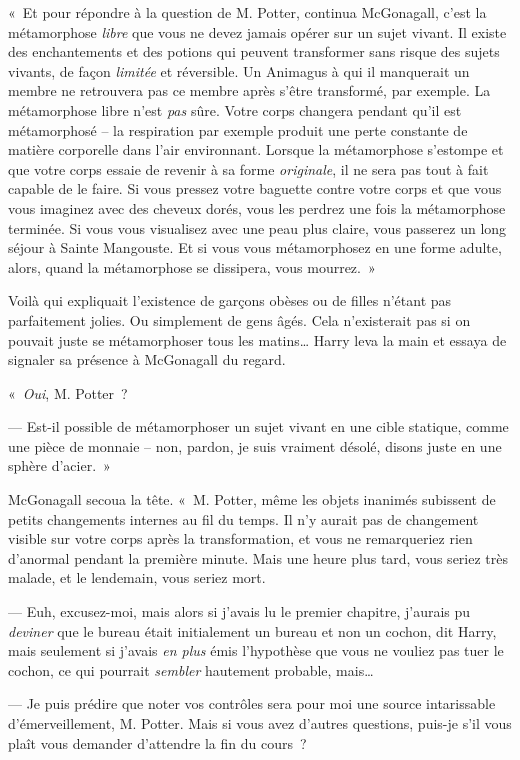 «~Et pour répondre à la question de M. Potter, continua McGonagall, c'est la métamorphose \emph{libre} que vous ne devez jamais opérer sur un sujet vivant.
Il existe des enchantements et des potions qui peuvent transformer sans risque des sujets vivants, de façon \emph{limitée} et réversible.
Un Animagus à qui il manquerait un membre ne retrouvera pas ce membre après s'être transformé, par exemple.
La métamorphose libre n'est \emph{pas} sûre.
Votre corps changera pendant qu'il est métamorphosé -- la respiration par exemple produit une perte constante de matière corporelle dans l'air environnant.
Lorsque la métamorphose s'estompe et que votre corps essaie de revenir à sa forme \emph{originale}, il ne sera pas tout à fait capable de le faire.
Si vous pressez votre baguette contre votre corps et que vous vous imaginez avec des cheveux dorés, vous les perdrez une fois la métamorphose terminée.
Si vous vous visualisez avec une peau plus claire, vous passerez un long séjour à Sainte Mangouste.
Et si vous vous métamorphosez en une forme adulte, alors, quand la métamorphose se dissipera, vous mourrez.~»

Voilà qui expliquait l'existence de garçons obèses ou de filles n'étant pas parfaitement jolies.
Ou simplement de gens âgés.
Cela n'existerait pas si on pouvait juste se métamorphoser tous les matins…
Harry leva la main et essaya de signaler sa présence à McGonagall du regard.

«~\emph{Oui}, M. Potter~?

--- Est-il possible de métamorphoser un sujet vivant en une cible statique, comme une pièce de monnaie -- non, pardon, je suis vraiment désolé, disons juste en une sphère d'acier.~»

McGonagall secoua la tête.
«~M. Potter, même les objets inanimés subissent de petits changements internes au fil du temps.
Il n'y aurait pas de changement visible sur votre corps après la transformation, et vous ne remarqueriez rien d'anormal pendant la première minute.
Mais une heure plus tard, vous seriez très malade, et le lendemain, vous seriez mort.

--- Euh, excusez-moi, mais alors si j'avais lu le premier chapitre, j'aurais pu \emph{deviner} que le bureau était initialement un bureau et non un cochon, dit Harry, mais seulement si j'avais \emph{en plus} émis l'hypothèse que vous ne vouliez pas tuer le cochon, ce qui pourrait \emph{sembler} hautement probable, mais…

--- Je puis prédire que noter vos contrôles sera pour moi une source intarissable d'émerveillement, M. Potter.
Mais si vous avez d'autres questions, puis-je s'il vous plaît vous demander d'attendre la fin du cours~?

